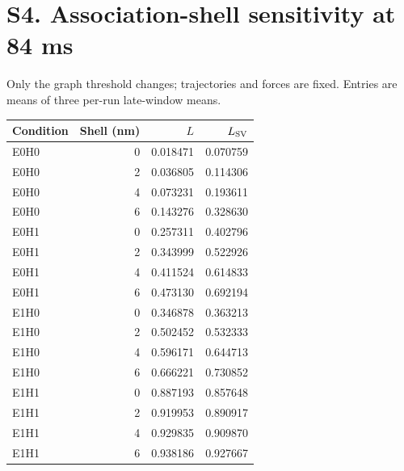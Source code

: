 \documentclass[11pt,letterpaper]{article}
\begin{document}
\section*{S4. Association-shell sensitivity at 84 ms}
Only the graph threshold changes; trajectories and forces are fixed.
Entries are means of three per-run late-window means.
\begin{center}\small
\begin{tabular}{lrrr}
\toprule
Condition & Shell (nm) & $L$ & $L_{\rm SV}$ \\ \midrule
E0H0 & 0 & 0.018471 & 0.070759 \\
E0H0 & 2 & 0.036805 & 0.114306 \\
E0H0 & 4 & 0.073231 & 0.193611 \\
E0H0 & 6 & 0.143276 & 0.328630 \\
E0H1 & 0 & 0.257311 & 0.402796 \\
E0H1 & 2 & 0.343999 & 0.522926 \\
E0H1 & 4 & 0.411524 & 0.614833 \\
E0H1 & 6 & 0.473130 & 0.692194 \\
E1H0 & 0 & 0.346878 & 0.363213 \\
E1H0 & 2 & 0.502452 & 0.532333 \\
E1H0 & 4 & 0.596171 & 0.644713 \\
E1H0 & 6 & 0.666221 & 0.730852 \\
E1H1 & 0 & 0.887193 & 0.857648 \\
E1H1 & 2 & 0.919953 & 0.890917 \\
E1H1 & 4 & 0.929835 & 0.909870 \\
E1H1 & 6 & 0.938186 & 0.927667 \\
\bottomrule\end{tabular}\end{center}
\clearpage
\end{document}
